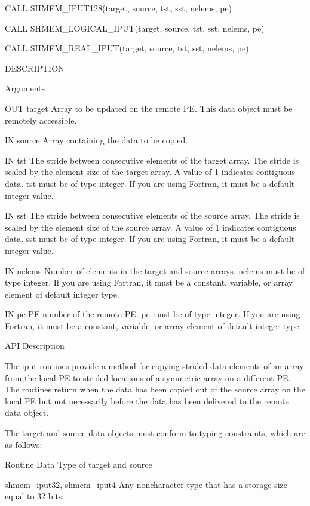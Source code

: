 	  CALL SHMEM_IPUT128(target, source, tst, sst, nelems, pe)

	  CALL SHMEM_LOGICAL_IPUT(target, source, tst, sst, nelems, pe)

	  CALL SHMEM_REAL_IPUT(target, source, tst, sst, nelems, pe)

DESCRIPTION

Arguments

 	OUT      target	 Array to be updated on the remote PE.	This data object  must
		 be remotely accessible.

       IN	source	 Array containing the data to be copied.

       IN	tst	 The  stride between consecutive elements of the target array.
		 The stride is scaled by the element size of the target array.
		 A  value of 1 indicates contiguous data.  tst must be of type
		 integer.  If you are using Fortran,  it  must	be  a  default
		 integer value.

       IN	sst	 The  stride between consecutive elements of the source array.
		 The stride is scaled by the element size of the source array.
		 A  value of 1 indicates contiguous data.  sst must be of type
		 integer.  If you are using Fortran,  it  must	be  a  default
		 integer value.

       IN	nelems	 Number of elements in the target and source arrays.  nelems must
		 be of type integer.  If you are using Fortran, it must	 be  a
		 constant, variable, or array element of default integer type.

       IN	pe	 PE number of the remote PE.  pe must be of type integer.   If
		 you  are  using  Fortran, it must be a constant, variable, or
		 array element of default integer type.

API Description

       The iput routines provide  a method  for  copying 
       strided	data elements of an array  from  the  local PE  to strided locations 
       of a symmetric array on a
       different PE.  The routines return when the data has been copied out of
       the  source  array  on the local PE but not necessarily before the data
       has been delivered to the remote data object.

       The target and source data objects must conform to typing  constraints,
       which are as follows:

       Routine			     Data Type of target and source

       shmem_iput32, shmem_iput4     Any  noncharacter type that has a storage
				     size equal to 32 bits.


